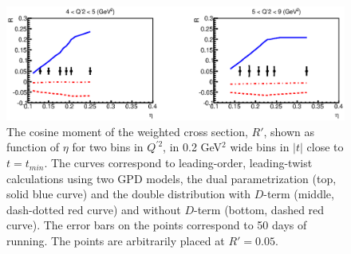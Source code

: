 \begin{figure}[t]
\includegraphics[scale=0.7]{R_Q2bin.eps}
\caption{\small{
The cosine moment of the weighted cross section, $R'$, shown as function of
$\eta$ for two bins in $Q^{\prime 2}$, in 0.2 GeV$^2$ wide bins in $|t|$
close to $t=t_{min}$. The curves correspond to leading-order, leading-twist
calculations using two GPD models, the dual parametrization 
\cite{Polyakov:2002wz,Guzey:2006xi,Guzey:2008ys,Polyakov:2008aa} (top, solid
blue curve) and the double distribution \cite{Radyushkin:1998es} with $D$-term
(middle, dash-dotted red curve) and without $D$-term (bottom, dashed red
curve). The error bars on the points correspond to 50 days of running.
The points are arbitrarily placed at $R' = 0.05$.}}
\label{fig:R_Q2bin}
\end{figure}

